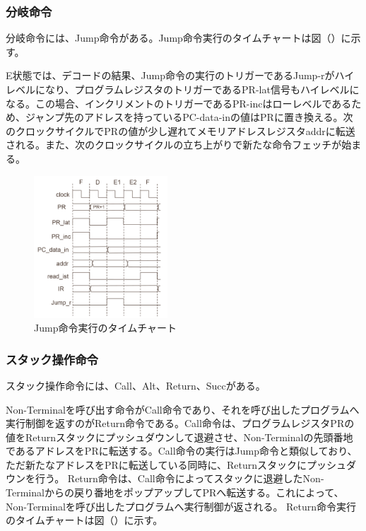 \documentclass[paper]{ieicej}
\begin{document}
\subsubsection{分岐命令}

分岐命令には、Jump命令がある。Jump命令実行のタイムチャートは図（）に示す。

E状態では、デコードの結果、Jump命令の実行のトリガーであるJump-rがハイレベルになり、プログラムレジスタのトリガーであるPR-lat信号もハイレベルになる。この場合、インクリメントのトリガーであるPR-incはローレベルであるため、ジャンプ先のアドレスを持っているPC-data-inの値はPRに置き換える。次のクロックサイクルでPRの値が少し遅れてメモリアドレスレジスタaddrに転送される。また、次のクロックサイクルの立ち上がりで新たな命令フェッチが始まる。


\begin{figure}[h]
    \begin{center}
        \includegraphics[width=50mm]{./fig/Jump}
       \caption{Jump命令実行のタイムチャート}
    \end{center}
\end{figure}

\subsubsection{スタック操作命令}
スタック操作命令には、Call、Alt、Return、Succがある。

Non-Terminalを呼び出す命令がCall命令であり、それを呼び出したプログラムへ実行制御を返すのがReturn命令である。Call命令は、プログラムレジスタPRの値をReturnスタックにプッシュダウンして退避させ、Non-Terminalの先頭番地であるアドレスをPRに転送する。Call命令の実行はJump命令と類似しており、ただ新たなアドレスをPRに転送している同時に、Returnスタックにプッシュダウンを行う。
Return命令は、Call命令によってスタックに退避したNon-Terminalからの戻り番地をポップアップしてPRへ転送する。これによって、Non-Terminalを呼び出したプログラムへ実行制御が返される。
Return命令実行のタイムチャートは図（）に示す。
\end{document}
